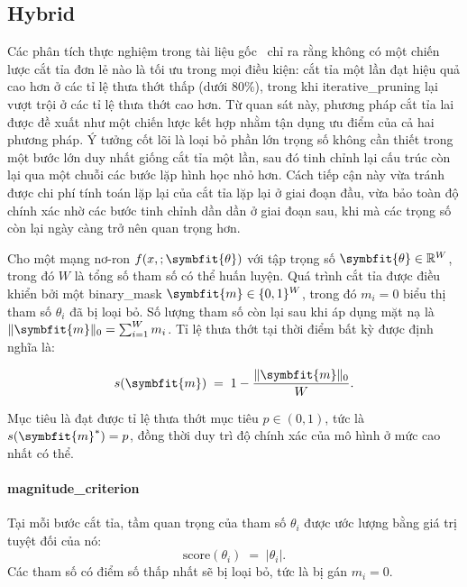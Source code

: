 \subsection{Hybrid}
Các phân tích thực nghiệm trong tài liệu gốc~\cite{hybrid} chỉ ra rằng không có một chiến lược cắt tỉa đơn lẻ nào là tối ưu trong mọi điều kiện: cắt tỉa một lần đạt hiệu quả cao hơn ở các tỉ lệ thưa thớt thấp (dưới $80\%$), trong khi \gls{iterative_pruning} lại vượt trội ở các tỉ lệ thưa thớt cao hơn.
Từ quan sát này, phương pháp cắt tỉa lai được đề xuất như một chiến lược kết hợp nhằm tận dụng ưu điểm của cả hai phương pháp.
Ý tưởng cốt lõi là loại bỏ phần lớn trọng số không cần thiết trong một bước lớn duy nhất giống cắt tỉa một lần, sau đó tinh chỉnh lại cấu trúc còn lại qua một chuỗi các bước lặp hình học nhỏ hơn.
Cách tiếp cận này vừa tránh được chi phí tính toán lặp lại của cắt tỉa lặp lại ở giai đoạn đầu, vừa bảo toàn độ chính xác nhờ các bước tinh chỉnh dần dần ở giai đoạn sau, khi mà các trọng số còn lại ngày càng trở nên quan trọng hơn.

Cho một mạng nơ-ron $f(x,;\symbfit{\theta})$ với tập trọng số
$\symbfit{\theta} \in \mathbb{R}^{W}$, trong đó $W$ là tổng số tham số có thể huấn luyện.
Quá trình cắt tỉa được điều khiển bởi một 
\gls{binary_mask}
$\symbfit{m} \in \{0,1\}^{W}$,
trong đó $m_i = 0$ biểu thị tham số $\theta_i$ đã bị loại bỏ.
Số lượng tham số còn lại sau khi áp dụng mặt nạ là
$\|\symbfit{m}\|_0 = \sum_{i=1}^{W} m_i$.
Tỉ lệ thưa thớt tại thời điểm bất kỳ được định nghĩa là:

\begin{equation}
    s(\symbfit{m}) \;=\; 1 - \frac{\|\symbfit{m}\|_0}{W}.
    \label{eq:sparsity}
\end{equation}

Mục tiêu là đạt được tỉ lệ thưa thớt mục tiêu $p \in (0,1)$, tức là
$s(\symbfit{m}^*) = p$, đồng thời duy trì độ chính xác của mô hình ở mức cao nhất có thể.

\paragraph{\textbf{\gls{magnitude_criterion}}}\cite{hybrid}
Tại mỗi bước cắt tỉa, tầm quan trọng của tham số $\theta_i$ được ước lượng bằng giá trị tuyệt đối của nó:
\begin{equation}
    \text{score}(\theta_i) \;=\; |\theta_i|.
    \label{eq:magnitude}
\end{equation}
Các tham số có điểm số thấp nhất sẽ bị loại bỏ, tức là bị gán $m_i = 0$.

